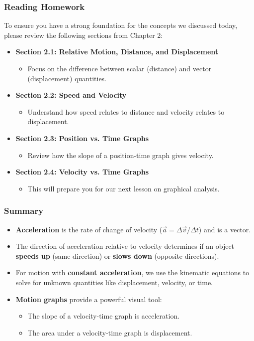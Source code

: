 \documentclass{beamer}
\begin{document}
\begin{frame}
\frametitle{Reading Homework}
To ensure you have a strong foundation for the concepts we discussed today, please review the following sections from Chapter 2:
\begin{itemize}
    \item \textbf{Section 2.1: Relative Motion, Distance, and Displacement}
    \begin{itemize}
        \item Focus on the difference between scalar (distance) and vector (displacement) quantities.
    \end{itemize}
    \pause
    \item \textbf{Section 2.2: Speed and Velocity}
    \begin{itemize}
        \item Understand how speed relates to distance and velocity relates to displacement.
    \end{itemize}
    \pause
    \item \textbf{Section 2.3: Position vs. Time Graphs}
    \begin{itemize}
        \item Review how the slope of a position-time graph gives velocity.
    \end{itemize}
    \pause
    \item \textbf{Section 2.4: Velocity vs. Time Graphs}
    \begin{itemize}
        \item This will prepare you for our next lesson on graphical analysis.
    \end{itemize}
\end{itemize}
\end{frame}

\begin{frame}
\frametitle{Summary}
\begin{itemize}
    \item \textbf{Acceleration} is the rate of change of velocity ($\vec{a} = \Delta\vec{v} / \Delta t$) and is a vector.
    \pause
    \item The direction of acceleration relative to velocity determines if an object \textbf{speeds up} (same direction) or \textbf{slows down} (opposite directions).
    \pause
    \item For motion with \textbf{constant acceleration}, we use the kinematic equations to solve for unknown quantities like displacement, velocity, or time.
    \pause
    \item \textbf{Motion graphs} provide a powerful visual tool:
    \begin{itemize}
        \item The slope of a velocity-time graph is \alert{acceleration}.
        \item The area under a velocity-time graph is \alert{displacement}.
    \end{itemize}
\end{itemize}
\end{frame}
\end{document}

